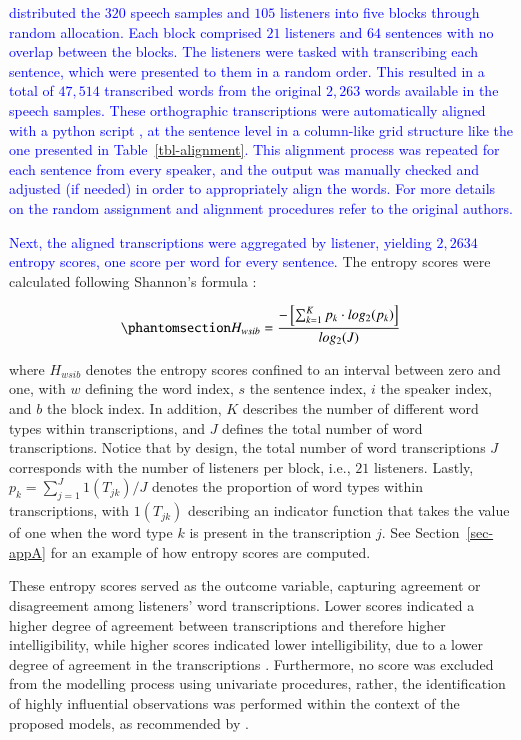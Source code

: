 \documentclass[
  authoryear,
  preprint,
  1p]{elsarticle}
\begin{document}
\textcolor{blue}{\citet{Boonen_et_al_2023} distributed the \(320\) speech samples and
\(105\) listeners into five blocks through random allocation. Each block
comprised \(21\) listeners and \(64\) sentences with no overlap between
the blocks. The listeners were tasked with transcribing each sentence,
which were presented to them in a random order. This resulted in a total
of \(47,514\) transcribed words from the original \(2,263\) words
available in the speech samples. These orthographic transcriptions were
automatically aligned with a python script \citep{Boonen_et_al_2023}, at
the sentence level in a column-like grid structure like the one
presented in Table~\ref{tbl-alignment}. This alignment process was
repeated for each sentence from every speaker, and the output was
manually checked and adjusted (if needed) in order to appropriately
align the words. For more details on the random assignment and alignment
procedures refer to the original authors.}

\textcolor{blue}{Next, the aligned transcriptions were aggregated by listener, yielding
\(2,2634\) entropy scores, one score per word for every sentence.} The
entropy scores were calculated following Shannon's formula
\citeyearpar{Shannon_1948}:

\begin{equation}\phantomsection\label{eq-entropy}{
H_{wsib} = \frac{ -\left[ \sum_{k=1}^{K}  p_{k} \cdot log_{2}(p_{k}) \right] }{ log_{2}(J)}
}\end{equation}

where \(H_{wsib}\) denotes the entropy scores confined to an interval
between zero and one, with \(w\) defining the word index, \(s\) the
sentence index, \(i\) the speaker index, and \(b\) the block index. In
addition, \(K\) describes the number of different word types within
transcriptions, and \(J\) defines the total number of word
transcriptions. Notice that by design, the total number of word
transcriptions \(J\) corresponds with the number of listeners per block,
i.e., \(21\) listeners. Lastly, \(p_{k} = \sum_{j=1}^{J} 1(T_{jk}) / J\)
denotes the proportion of word types within transcriptions, with
\(1(T_{jk})\) describing an indicator function that takes the value of
one when the word type \(k\) is present in the transcription \(j\). See
Section~\ref{sec-appA} for an example of how entropy scores are
computed.

These entropy scores served as the outcome variable, capturing agreement
or disagreement among listeners' word transcriptions. Lower scores
indicated a higher degree of agreement between transcriptions and
therefore higher intelligibility, while higher scores indicated lower
intelligibility, due to a lower degree of agreement in the
transcriptions \citep{Boonen_et_al_2023, Faes_et_al_2022}. Furthermore,
no score was excluded from the modelling process using univariate
procedures, rather, the identification of highly influential
observations was performed within the context of the proposed models, as
recommended by \citet{McElreath_2020}.
\end{document}
